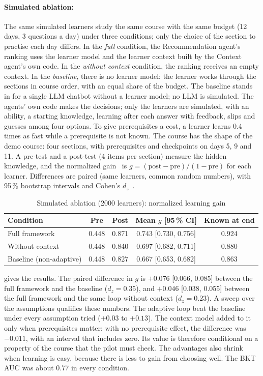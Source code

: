 \paragraph{Simulated ablation:} The same simulated learners study the
same course with the same budget (12 days, 3 questions a day) under three
conditions; only the choice of the section to practise each day differs.
In the \emph{full} condition, the Recommendation agent's ranking uses the
learner model and the learner context built by the Context agent's own
code. In the \emph{without context} condition, the ranking receives an
empty context. In the \emph{baseline}, there is no learner model: the
learner works through the sections in course order, with an equal share
of the budget. The baseline stands in for a single LLM chatbot without a
learner model; no LLM is simulated. The agents' own code makes the
decisions; only the learners are simulated, with an ability, a starting
knowledge, learning after each answer with feedback, slips and guesses
among four options. To give prerequisites a cost, a learner learns
0.4 times as fast while a prerequisite is not known. The course has the
shape of the demo course: four sections, with prerequisites and
checkpoints on days 5, 9 and 11. A pre-test and a post-test (4 items per
section) measure the hidden knowledge, and the normalized
gain~\cite{hake1998gain} is $g = (\text{post} - \text{pre}) / (1 -
\text{pre})$ for each learner. Differences are paired (same learners,
common random numbers), with 95\,\% bootstrap intervals and Cohen's
$d_z$~\cite{cohen1988}.

\begin{table}[htbp]
\centering
\caption{Simulated ablation (2000 learners): normalized learning gain}
\label{tab-ablation}
\small
\begin{tabular}{@{}lcccc@{}}
\toprule
\textbf{Condition} & \textbf{Pre} & \textbf{Post} & \textbf{Mean $g$ [95\,\% CI]} &
  \textbf{Known at end} \\
\midrule
Full framework & 0.448 & 0.871 & 0.743 [0.730, 0.756] & 0.924 \\
Without context & 0.448 & 0.840 & 0.697 [0.682, 0.711] & 0.880 \\
Baseline (non-adaptive) & 0.448 & 0.827 & 0.667 [0.653, 0.682] & 0.863 \\
\bottomrule
\end{tabular}
\end{table}

 gives the results. The paired difference in $g$ is
$+0.076$ [0.066, 0.085] between the full framework and the baseline
($d_z = 0.35$), and $+0.046$ [0.038, 0.055] between the full framework
and the same loop without context ($d_z = 0.23$). A sweep over the
assumptions qualifies these numbers. The adaptive loop beat the baseline
under every assumption tried ($+0.03$ to $+0.13$). The context model added
to it only when prerequisites matter: with no prerequisite effect, the
difference was $-0.011$, with an interval that includes zero. Its value is
therefore conditional on a property of the course that the pilot must
check. The advantages also shrink when learning is easy, because there is
less to gain from choosing well. The BKT AUC was about 0.77 in every
condition.

